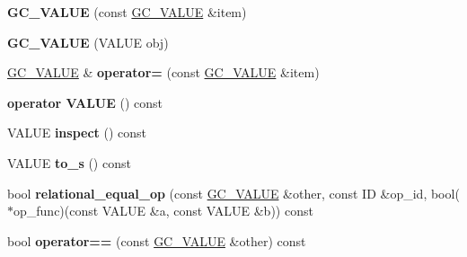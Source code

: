 \begin{DoxyCompactItemize}
\item 
{\bfseries G\+C\+\_\+\+V\+A\+L\+UE} (const \hyperlink{classswig_1_1GC__VALUE}{G\+C\+\_\+\+V\+A\+L\+UE} \&item)\hypertarget{classswig_1_1GC__VALUE_a0c1ae93e755867de71decd8f39ea3ef2}{}\label{classswig_1_1GC__VALUE_a0c1ae93e755867de71decd8f39ea3ef2}

\item 
{\bfseries G\+C\+\_\+\+V\+A\+L\+UE} (V\+A\+L\+UE obj)\hypertarget{classswig_1_1GC__VALUE_ad335e00d57a5f83f2246289a614e08aa}{}\label{classswig_1_1GC__VALUE_ad335e00d57a5f83f2246289a614e08aa}

\item 
\hyperlink{classswig_1_1GC__VALUE}{G\+C\+\_\+\+V\+A\+L\+UE} \& {\bfseries operator=} (const \hyperlink{classswig_1_1GC__VALUE}{G\+C\+\_\+\+V\+A\+L\+UE} \&item)\hypertarget{classswig_1_1GC__VALUE_a1498d7519ada2e274693e3434243dd99}{}\label{classswig_1_1GC__VALUE_a1498d7519ada2e274693e3434243dd99}

\item 
{\bfseries operator V\+A\+L\+UE} () const \hypertarget{classswig_1_1GC__VALUE_a05885f035638f17c8a1341e11308562b}{}\label{classswig_1_1GC__VALUE_a05885f035638f17c8a1341e11308562b}

\item 
V\+A\+L\+UE {\bfseries inspect} () const \hypertarget{classswig_1_1GC__VALUE_ae4553c8bc2325be1c2cff2ecd10d2359}{}\label{classswig_1_1GC__VALUE_ae4553c8bc2325be1c2cff2ecd10d2359}

\item 
V\+A\+L\+UE {\bfseries to\+\_\+s} () const \hypertarget{classswig_1_1GC__VALUE_a65d6f5f1b29ad335ed4581281cb1aac5}{}\label{classswig_1_1GC__VALUE_a65d6f5f1b29ad335ed4581281cb1aac5}

\item 
bool {\bfseries relational\+\_\+equal\+\_\+op} (const \hyperlink{classswig_1_1GC__VALUE}{G\+C\+\_\+\+V\+A\+L\+UE} \&other, const ID \&op\+\_\+id, bool($\ast$op\+\_\+func)(const V\+A\+L\+UE \&a, const V\+A\+L\+UE \&b)) const \hypertarget{classswig_1_1GC__VALUE_ada3273dfe1f27f520cd14880f13d904a}{}\label{classswig_1_1GC__VALUE_ada3273dfe1f27f520cd14880f13d904a}

\item 
bool {\bfseries operator==} (const \hyperlink{classswig_1_1GC__VALUE}{G\+C\+\_\+\+V\+A\+L\+UE} \&other) const \hypertarget{classswig_1_1GC__VALUE_af863caf3a82a6f7dc8a2345a09474099}{}\label{classswig_1_1GC__VALUE_af863caf3a82a6f7dc8a2345a09474099}


\end{DoxyCompactItemize}
